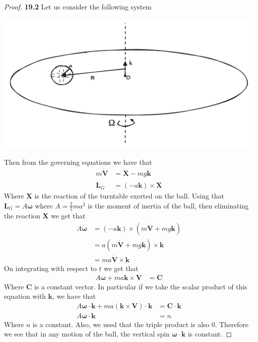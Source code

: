 \documentclass[11pt]{article}
\newcommand{\uvk}{\bm{k}}
\theoremstyle{definition}
\begin{document}
\cleardoublepage
\begin{proof}{\textbf{19.2}}
    Let us consider the following system
    \begin{center}
        \includegraphics[scale=0.3]{ch19-2.png}
    \end{center}
    Then from the governing equations we have that
    \begin{align*}
        m\bm{\dot{V}} &= \bm{X} - mg\bm{k}\\
        \bm{\dot{L}}_G &= (-a\bm{k}) \times \bm{X} 
    \end{align*}
    Where $\bm{X}$ is the reaction of the turntable exerted on the ball.
    Using that $\bm{L}_G = A\bm{\omega}$ where $A = \frac{2}{5}ma^2$ is the
    moment of inertia of the ball, then eliminating the reaction $\bm{X}$
    we get that
    \begin{align*}
        A\bm{\dot{\omega}}
        &= (-a\bm{k})
        \times (m\bm{\dot{V}} + mg\bm{k})\\
        &= a(m\bm{\dot{V}} + mg\uvk)
        \times \bm{k}\\
        &= ma\bm{\dot{V}}\times\bm{k}
    \end{align*}
    On integrating with respect to $t$ we get that
    \begin{align*}
        A\bm{\omega} + ma\bm{k}\times\bm{V} &= \bm{C}
    \end{align*}
    Where $\bm{C}$ is a constant vector. In particular if we take the scalar
    product of this equation with $\bm{k}$, we have that
    \begin{align*}
        A\bm{\omega}\cdot\uvk + ma(\bm{k}\times\bm{V})\cdot\uvk
        &= \bm{C}\cdot\uvk\\
        A\bm{\omega}\cdot\uvk &= n
    \end{align*}
    Where $n$ is a constant. Also, we used that the triple product is also 0.
    Therefore we see that in any motion of the ball, the vertical spin
    $\bm{\omega}\cdot\uvk$ is constant.


\end{proof}
\end{document}
